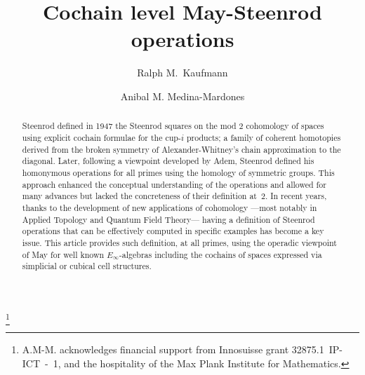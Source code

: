 \documentclass[A4]{amsart}
\theoremstyle{definition}
\begin{document}
	
\title{Cochain level May-Steenrod operations}

\author[R. Kaufmann]{Ralph M.\ Kaufmann}
\address{Department of Mathematics, Department of Physics and Astronomy, Purdue University}

\author[A. Medina-Mardones]{Anibal M. Medina-Mardones}
\address{Laboratory for Topology and Neuroscience, École Polytechnique Fédérale de Lausanne, Switzerland}
\address{Department of Mathematics, University of Notre Dame du Lac, Notre Dame, IN, USA}
\thanks{A.M-M. acknowledges financial support from Innosuisse grant \mbox{32875.1 IP-ICT - 1}, and the hospitality of the Max Plank Institute for Mathematics.}


\begin{abstract}
	Steenrod defined in 1947 the Steenrod squares on the mod 2 cohomology of spaces using explicit cochain formulae for the cup-$i$ products; a family of coherent homotopies derived from the broken symmetry of Alexander-Whitney's chain approximation to the diagonal. Later, following a viewpoint developed by Adem, Steenrod defined his homonymous operations for all primes using the homology of symmetric groups. This approach enhanced the conceptual understanding of the operations and allowed for many advances but lacked the concreteness of their definition at~$2$. In recent years, thanks to the development of new applications of cohomology ---most notably in Applied Topology and Quantum Field Theory--- having a definition of Steenrod operations that can be effectively computed in specific examples has become a key issue. This article provides such definition, at all primes, using the operadic viewpoint of May for well known $E_\infty$-algebras including the cochains of spaces expressed via simplicial or cubical cell structures.
\end{abstract}

\maketitle

\tableofcontents









\newpage
\appendix

 

	
\end{document}
